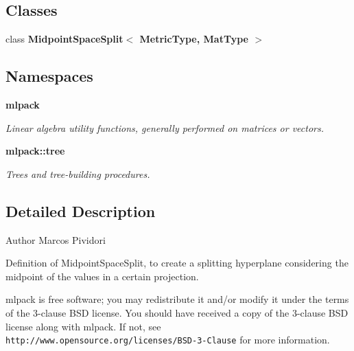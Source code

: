 \subsection*{Classes}
\begin{DoxyCompactItemize}
\item 
class \textbf{ Midpoint\+Space\+Split$<$ Metric\+Type, Mat\+Type $>$}
\end{DoxyCompactItemize}
\subsection*{Namespaces}
\begin{DoxyCompactItemize}
\item 
 \textbf{ mlpack}
\begin{DoxyCompactList}\small\item\em Linear algebra utility functions, generally performed on matrices or vectors. \end{DoxyCompactList}\item 
 \textbf{ mlpack\+::tree}
\begin{DoxyCompactList}\small\item\em Trees and tree-\/building procedures. \end{DoxyCompactList}\end{DoxyCompactItemize}


\subsection{Detailed Description}
\begin{DoxyAuthor}{Author}
Marcos Pividori
\end{DoxyAuthor}
Definition of Midpoint\+Space\+Split, to create a splitting hyperplane considering the midpoint of the values in a certain projection.

mlpack is free software; you may redistribute it and/or modify it under the terms of the 3-\/clause B\+SD license. You should have received a copy of the 3-\/clause B\+SD license along with mlpack. If not, see {\tt http\+://www.\+opensource.\+org/licenses/\+B\+S\+D-\/3-\/\+Clause} for more information. 